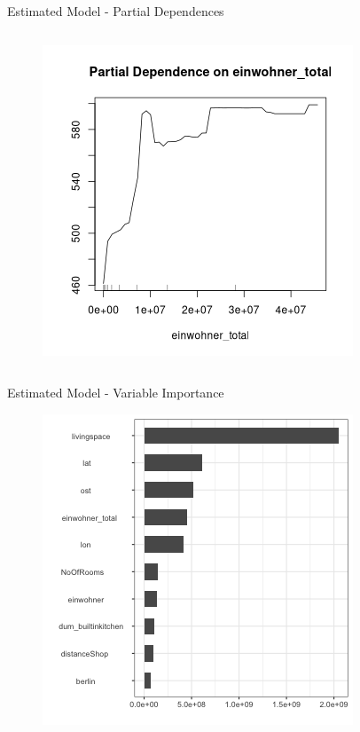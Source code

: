 \documentclass[11pt]{beamer}\usepackage[]{graphicx}\usepackage[]{color}
\begin{document}
\begin{frame}{Estimated Model - Partial Dependences}
\begin{columns}[t]
\begin{column}{.5\linewidth}
\begin{figure}
        \includegraphics[width=0.6\linewidth]{Partial_Dependence_einwohner_total.png}
       \end{figure}
\end{column}
\end{columns}
\end{frame}

\begin{frame}{Estimated Model - Variable Importance}
\begin{figure}
\centering
\includegraphics[width=0.6\linewidth]{Histogramm.png}
\end{figure}
\end{frame}
\end{document}
